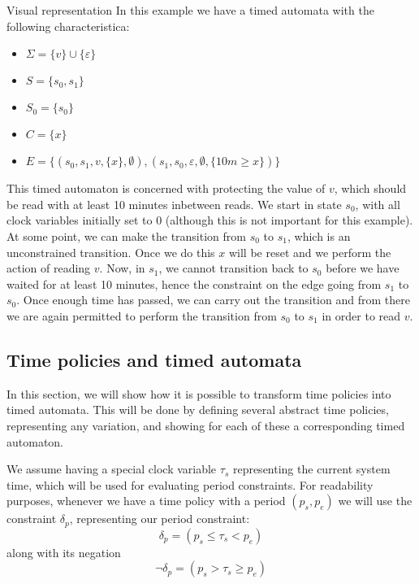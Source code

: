 \begin{example}{Visual representation}\label{time:ex:visualrepresentation}
In this example we have a timed automata with the following characteristica:
\begin{itemize}
  \item $\Sigma = \{ v \} \cup \{ \varepsilon \}$
  \item $S = \{ s_0, s_1 \}$
  \item $S_0 = \{ s_0 \}$
  \item $C = \{ x \}$
  \item $E = \{ (s_0, s_1, v, \{ x \}, \emptyset), (s_1, s_0, \varepsilon, \emptyset, \{ 10m \geq x \})\}$
\end{itemize}
This timed automaton is concerned with protecting the value of $v$, which should be read with at least 10 minutes inbetween reads.
We start in state $s_0$, with all clock variables initially set to $0$ (although this is not important for this example).
At some point, we can make the transition from $s_0$ to $s_1$, which is an unconstrained transition.
Once we do this $x$ will be reset and we perform the action of reading $v$.
Now, in $s_1$, we cannot transition back to $s_0$ before we have waited for at least 10 minutes, hence the constraint on the edge going from $s_1$ to $s_0$.
Once enough time has passed, we can carry out the transition and from there we are again permitted to perform the transition from $s_0$ to $s_1$ in order to read $v$.

  \begin{figure}[H]
    \centering
    
  \end{figure}
\end{example}

\subsection{Time policies and timed automata}\label{automata:timepolicies}
In this section, we will show how it is possible to transform \thelang{} time policies into timed automata.
This will be done by defining several abstract time policies, representing any variation, and showing for each of these a corresponding timed automaton.

We assume having a special clock variable $\tau_s$ representing the current system time, which will be used for evaluating period constraints.
For readability purposes, whenever we have a time policy with a period $(p_s, p_e)$ we will use the constraint $\delta_p$, representing our period constraint:
\[ \delta_p = (p_s \leq \tau_s < p_e) \]
along with its negation
\[ \lnot\delta_p = (p_s > \tau_s \geq p_e) \]


